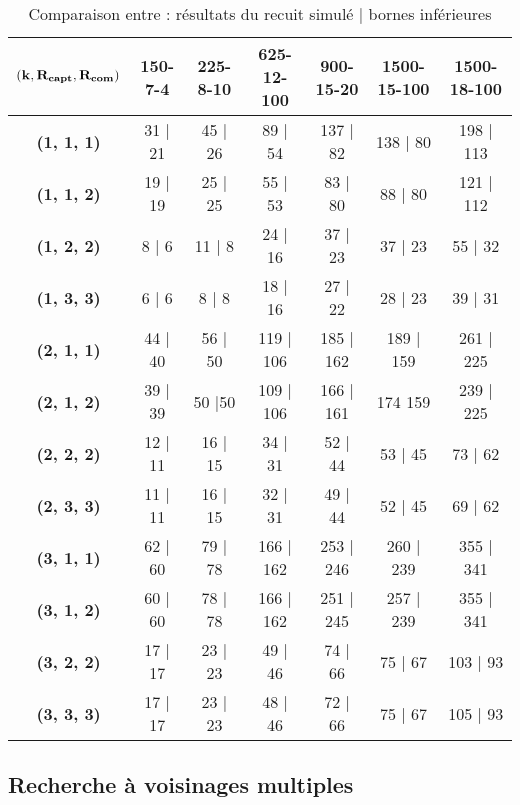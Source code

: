 \documentclass[12pt]{article}
\begin{document}
\begin{table}[]
  \caption{Comparaison entre : résultats du recuit simulé | bornes inférieures}
  \centering
  \label{tab:my-table}
  \begin{tabular}{|c|c|c|c|c|c|c|}
  \hline
  $\bf{(k, R_{capt}, R_{com})}$ & \textbf{150-7-4} & \textbf{225-8-10} & \textbf{625-12-100} & \textbf{900-15-20} & \textbf{1500-15-100} & \textbf{1500-18-100} \\ \hline
  \textbf{(1, 1, 1)} & 31 | 21            & 45 | 26             & 89 | 54               & 137 | 82             & 138 | 80               & 198 | 113              \\ \hline
  \textbf{(1, 1, 2)} & 19 | 19            & 25 | 25             & 55 | 53               & 83 | 80              & 88 | 80                & 121 | 112              \\ \hline
  \textbf{(1, 2, 2)} & 8 | 6              & 11 | 8              & 24 | 16               & 37 | 23              & 37 | 23                & 55 | 32                \\ \hline
  \textbf{(1, 3, 3)} & 6 | 6              & 8 | 8               & 18 | 16               & 27 | 22              & 28 | 23                & 39 | 31                \\ \hline
  \textbf{(2, 1, 1)} & 44 | 40            & 56 | 50             & 119 | 106             & 185 | 162            & 189 | 159              & 261 | 225              \\ \hline
  \textbf{(2, 1, 2)} & 39 | 39            & 50 |50              & 109 | 106             & 166 | 161            & 174 159                & 239 | 225              \\ \hline
  \textbf{(2, 2, 2)} & 12 | 11            & 16 | 15             & 34 | 31               & 52 | 44              & 53 | 45                & 73 | 62                \\ \hline
  \textbf{(2, 3, 3)} & 11 | 11            & 16 | 15             & 32 | 31               & 49 | 44              & 52 | 45                & 69 | 62                \\ \hline
  \textbf{(3, 1, 1)} & 62 | 60            & 79 | 78             & 166 | 162             & 253 | 246            & 260 | 239              & 355 | 341              \\ \hline
  \textbf{(3, 1, 2)} & 60 | 60            & 78 | 78             & 166 | 162             & 251 | 245            & 257 | 239              & 355 | 341              \\ \hline
  \textbf{(3, 2, 2)} & 17 | 17            & 23 | 23             & 49 | 46               & 74 | 66              & 75 | 67                & 103 | 93               \\ \hline
  \textbf{(3, 3, 3)} & 17 | 17            & 23 | 23             & 48 | 46               & 72 | 66              & 75 | 67                & 105 | 93               \\ \hline
  \end{tabular}
  \end{table}


\subsection{Recherche à voisinages multiples}

\end{document}
